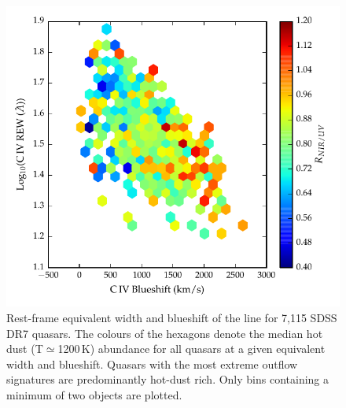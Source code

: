 \begin{figure}
\centering
  \includegraphics[width=\columnwidth]{figures/chapter05/hot_dust_ratio.pdf}
  \caption{Rest-frame equivalent width and blueshift of the  line for 7,115 SDSS DR7 quasars. The colours of the hexagons denote the median hot dust (T$\simeq$1200\,K) abundance for all quasars at a given equivalent width and blueshift. Quasars with the most extreme outflow signatures are predominantly hot-dust rich. Only bins containing a minimum of two objects are plotted.}
  \label{fig:civ_hot_dust}
\end{figure}

